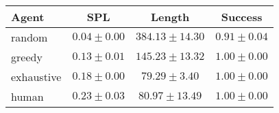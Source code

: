 \begin{tabular}{lccc}
    \toprule
    Agent & SPL & Length & Success \\
    \midrule
    random & $0.04 \pm 0.00$ & $384.13 \pm 14.30$ & $0.91 \pm 0.04$\\
    greedy & $0.13 \pm 0.01$ & $145.23 \pm 13.32$ & $1.00 \pm 0.00$\\
    exhaustive & $0.18 \pm 0.00$ & $79.29 \pm 3.40$ & $1.00 \pm 0.00$\\
    human & $0.23 \pm 0.03$ & $80.97 \pm 13.49$ & $1.00 \pm 0.00$\\
    \bottomrule
\end{tabular}
